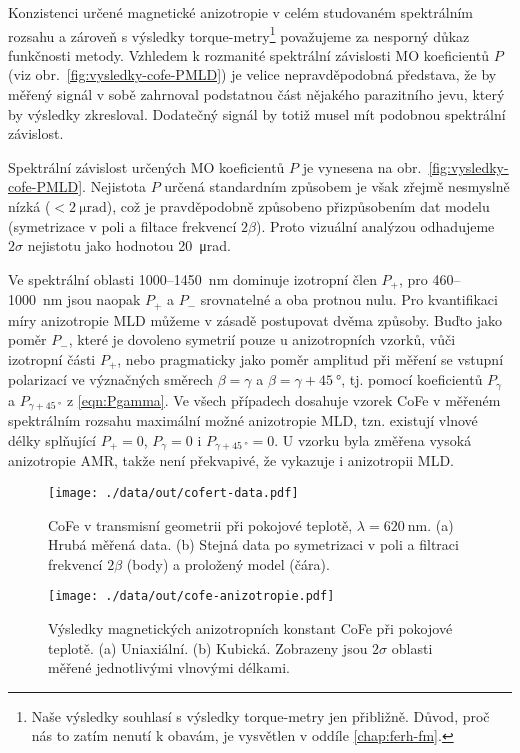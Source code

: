 Konzistenci určené magnetické anizotropie v celém studovaném spektrálním rozsahu a zároveň s výsledky torque-metry\footnote{Naše výsledky souhlasí s výsledky torque-metry jen přibližně. Důvod, proč nás to zatím nenutí k obavám, je vysvětlen v oddíle \ref{chap:ferh-fm}.} považujeme za nesporný důkaz funkčnosti metody.
Vzhledem k rozmanité spektrální závislosti MO koeficientů $P$ (viz obr.~\ref{fig:vysledky-cofe-PMLD}) je velice nepravděpodobná představa, že by měřený signál v sobě zahrnoval podstatnou část nějakého parazitního jevu, který by výsledky zkresloval.
Dodatečný signál by totiž musel mít podobnou spektrální závislost.

Spektrální závislost určených MO koeficientů $P$ je vynesena na obr.~\ref{fig:vysledky-cofe-PMLD}.
Nejistota $P$ určená standardním způsobem je však zřejmě nesmyslně nízká ($<\SI{2}{\micro\radian}$), což je pravděpodobně způsobeno přizpůsobením dat modelu (symetrizace v poli a filtace frekvencí $2\beta$).
Proto vizuální analýzou odhadujeme $2\sigma$ nejistotu jako hodnotou \SI{20}{\micro\radian}.

Ve spektrální oblasti \num{1000}--\SI{1450}{\nano\meter} dominuje izotropní člen $P_+$, pro \num{460}--\SI{1000}{\nano\meter} jsou naopak $P_+$ a $P_-$ srovnatelné a oba protnou nulu.
Pro kvantifikaci míry anizotropie MLD můžeme v zásadě postupovat dvěma způsoby.
Buďto jako poměr $P_-$, které je dovoleno symetrií pouze u anizotropních vzorků, vůči izotropní části $P_+$, nebo pragmaticky jako poměr amplitud při měření se vstupní polarizací ve význačných směrech $\beta=\gamma$ a $\beta=\gamma+\SI{45}{\degree}$, tj. pomocí koeficientů $P_\gamma$ a $P_{\gamma+\SI{45}{\degree}}$ z \eqref{eqn:Pgamma}.
Ve všech případech dosahuje vzorek CoFe v měřeném spektrálním rozsahu maximální možné anizotropie MLD, tzn. existují vlnové délky splňující $P_+=0$, $P_\gamma=0$ i $P_{\gamma+\SI{45}{\degree}}=0$.
U vzorku byla změřena vysoká anizotropie AMR\cite{zengIntrinsicMechanismAnisotropic2020}, takže není překvapivé, že vykazuje i anizotropii MLD.


\begin{figure}[htbp]
    \centering
    \texttt{[image: ./data/out/cofert-data.pdf]}
    \caption{CoFe v transmisní geometrii při pokojové teplotě, $\lambda=\SI{620}{\nano\meter}$. (a) Hrubá měřená data. (b) Stejná data po symetrizaci v poli a filtraci frekvencí $2\beta$ (body) a proložený model (čára).}
    \label{fig:vysledky-cofe-data}
\end{figure}

\begin{figure}[htbp]
    \centering
    \texttt{[image: ./data/out/cofe-anizotropie.pdf]}
    \caption{Výsledky magnetických anizotropních konstant CoFe při pokojové teplotě. (a) Uniaxiální. (b) Kubická. Zobrazeny jsou $2\sigma$ oblasti měřené jednotlivými vlnovými délkami.}
    \label{fig:vysledky-cofe-roomt-anizotropie}
\end{figure}

